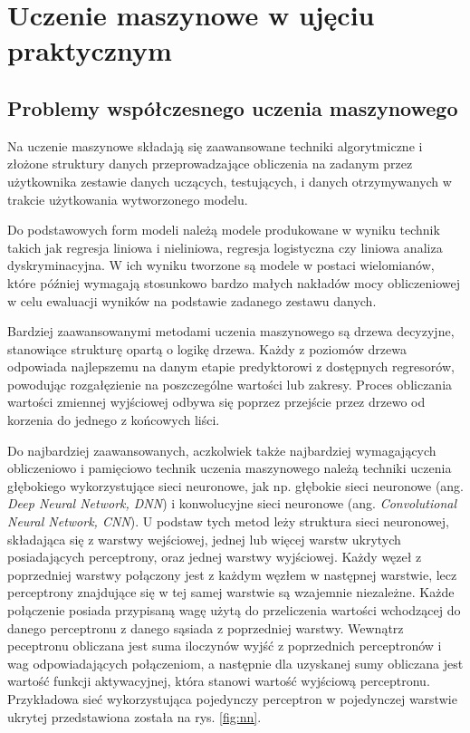 \chapter{Uczenie maszynowe w ujęciu praktycznym}
\section{Problemy współczesnego uczenia maszynowego}

Na uczenie maszynowe składają się zaawansowane techniki algorytmiczne i złożone struktury danych przeprowadzające obliczenia na zadanym przez użytkownika zestawie danych uczących, testujących, i danych otrzymywanych w trakcie użytkowania wytworzonego modelu. 

Do podstawowych form modeli należą modele produkowane w wyniku technik takich jak regresja liniowa i nieliniowa, regresja logistyczna czy liniowa analiza dyskryminacyjna. W ich wyniku tworzone są modele w postaci wielomianów, które później wymagają stosunkowo bardzo małych nakładów mocy obliczeniowej w celu ewaluacji wyników na podstawie zadanego zestawu danych.

Bardziej zaawansowanymi metodami uczenia maszynowego są drzewa decyzyjne, stanowiące strukturę opartą o logikę drzewa. Każdy z poziomów drzewa odpowiada najlepszemu na danym etapie predyktorowi z dostępnych regresorów, powodując rozgałęzienie na poszczególne wartości lub zakresy. Proces obliczania wartości zmiennej wyjściowej odbywa się poprzez przejście przez drzewo od korzenia do jednego z końcowych liści.

Do najbardziej zaawansowanych, aczkolwiek także najbardziej wymagających obliczeniowo i pamięciowo technik uczenia maszynowego należą techniki uczenia głębokiego wykorzystujące sieci neuronowe, jak np. głębokie sieci neuronowe (ang. \textit{Deep Neural Network, DNN}) i konwolucyjne sieci neuronowe (ang. \textit{Convolutional Neural Network, CNN}). U podstaw tych metod leży struktura sieci neuronowej, składająca się z warstwy wejściowej, jednej lub więcej warstw ukrytych posiadających perceptrony, oraz jednej warstwy wyjściowej. Każdy węzeł z poprzedniej warstwy połączony jest z każdym węzłem w następnej warstwie, lecz perceptrony znajdujące się w tej samej warstwie są wzajemnie niezależne. Każde połączenie posiada przypisaną wagę użytą do przeliczenia wartości wchodzącej do danego perceptronu z danego sąsiada z poprzedniej warstwy. Wewnątrz peceptronu obliczana jest suma iloczynów wyjść z poprzednich perceptronów i wag odpowiadających połączeniom, a następnie dla uzyskanej sumy obliczana jest wartość funkcji aktywacyjnej, która stanowi wartość wyjściową perceptronu. Przykładowa sieć wykorzystująca pojedynczy perceptron w pojedynczej warstwie ukrytej przedstawiona została na rys. \ref{fig:nn}. 

